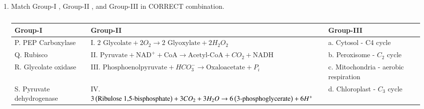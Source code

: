 \documentclass[journal,12pt,onecolumn]{IEEEtran}
\theoremstyle{remark}
\begin{document}
\begin{enumerate}
    \hfill{}
    \begin{enumerate}
     \end{enumerate}   

     \item Match Group-I , Group-II , and Group-III  in CORRECT combination.

    \hfill{}

    \begin{table}[h!]
    \centering
    \caption*{}
    \label{tab:q57}
    \begin{tabular}{lll}
    \hline
    \textbf{Group-I} & \textbf{Group-II} & \textbf{Group-III} \\
    \hline
    P. PEP Carboxylase & I. $2 \text{ Glycolate} + 2O_2 \rightarrow 2 \text{ Glyoxylate} + 2 H_2O_2$ & a. Cytosol - C4 cycle \\
    Q. Rubisco & II. $\text{Pyruvate} + \text{NAD}^+ + \text{CoA} \rightarrow \text{Acetyl-CoA} + CO_2 + \text{NADH}$ & b. Peroxisome - $C_2$ cycle \\
    R. Glycolate oxidase & III. $\text{Phosphoenolpyruvate} + HCO_3^- \rightarrow \text{Oxaloacetate} + P_i$ & c. Mitochondria - aerobic respiration \\
    S. Pyruvate dehydrogenase & IV. $3 \left(\text{Ribulose 1,5-bisphosphate}\right) + 3 CO_2 + 3 H_2O \rightarrow 6 \left(\text{3-phosphoglycerate}\right) + 6 H^+$ & d. Chloroplast - $C_3$ cycle \\
    \hline
    \end{tabular}
    \end{table}

    \begin{enumerate}
    \end{enumerate}


\end{enumerate}
\end{document}
